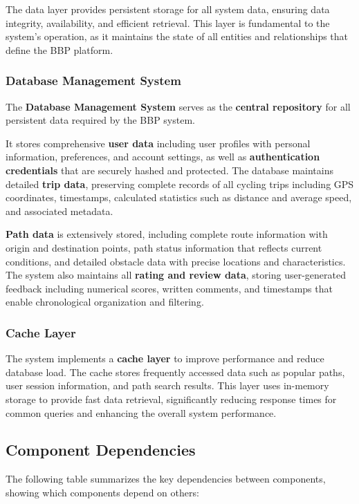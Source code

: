 The data layer provides persistent storage for all system data, ensuring data integrity, availability, and efficient retrieval. This layer is fundamental to the system's operation, as it maintains the state of all entities and relationships that define the BBP platform.

\subsubsection{Database Management System}
The \textbf{Database Management System} serves as the \textbf{central repository} for all persistent data required by the BBP system. 

It stores comprehensive \textbf{user data} including user profiles with personal information, preferences, and account settings, as well as \textbf{authentication credentials} that are securely hashed and protected. The database maintains detailed \textbf{trip data}, preserving complete records of all cycling trips including GPS coordinates, timestamps, calculated statistics such as distance and average speed, and associated metadata. 

\textbf{Path data} is extensively stored, including complete route information with origin and destination points, path status information that reflects current conditions, and detailed obstacle data with precise locations and characteristics. The system also maintains all \textbf{rating and review data}, storing user-generated feedback including numerical scores, written comments, and timestamps that enable chronological organization and filtering. 

\subsubsection{Cache Layer}
The system implements a \textbf{cache layer} to improve performance and reduce database load. The cache stores frequently accessed data such as popular paths, user session information, and path search results. This layer uses in-memory storage to provide fast data retrieval, significantly reducing response times for common queries and enhancing the overall system performance.

\subsection{Component Dependencies}

The following table summarizes the key dependencies between components, showing which components depend on others:

